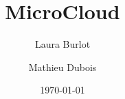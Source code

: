 \documentclass[a4paper]{article}
\title{MicroCloud}
\author{Laura Burlot \and Mathieu Dubois}
\date{\today}
\begin{document}
\maketitle
\sloppy
\newpage

\tableofcontents
\newpage
















\end{document}
